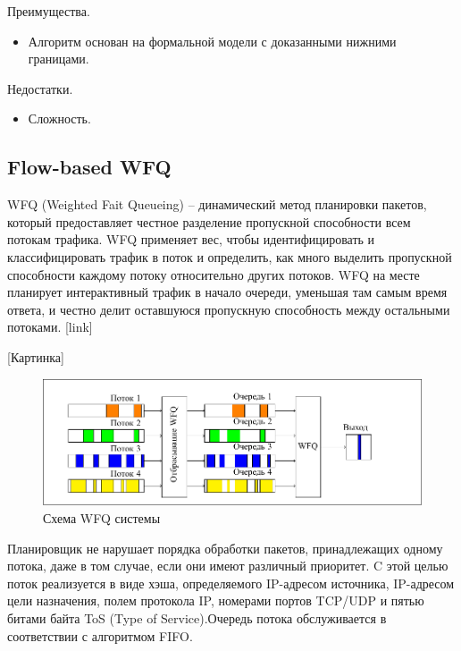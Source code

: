         Преимущества.
		\begin{itemize}
            \item Алгоритм основан на формальной модели с доказанными нижними границами.
		\end{itemize}

        Недостатки.
		\begin{itemize}
            \item Сложность.
		\end{itemize}

	\subsection{Flow-based WFQ}

	WFQ (Weighted Fait Queueing) -- динамический метод планировки пакетов, который
	предоставляет честное разделение пропускной способности всем потокам трафика.
	WFQ применяет вес, чтобы идентифицировать и классифицировать трафик
	в поток и определить, как много выделить пропускной способности каждому
	потоку относительно других потоков. WFQ на месте планирует интерактивный трафик в начало очереди,
	уменьшая там самым время ответа, и честно делит оставшуюся пропускную
	способность между остальными потоками. 
	[link]

	[Картинка]
	
	\begin{figure}[ht!]
		\includegraphics{./src/pdfimages/fwfq.pdf}
		\caption{Схема WFQ системы}
	\end{figure}


	Планировщик не нарушает порядка обработки пакетов,
	принадлежащих одному потока, даже в том случае, если они имеют различный приоритет.
	C этой целью поток реализуется в виде хэша, определяемого IP-адресом источника,
	IP-адресом цели назначения, полем протокола IP, номерами портов TCP/UDP и пятью
	битами байта ToS (Type of Service).Очередь потока обслуживается в соответствии с алгоритмом FIFO.

